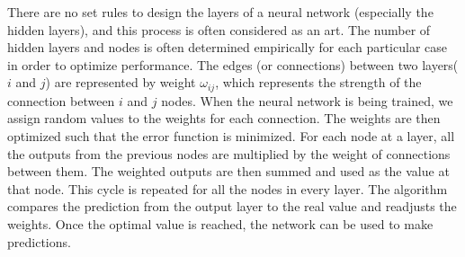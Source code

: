 There are no set rules to design the layers of a neural network (especially the hidden layers), and this process is often considered as an art\cite{NN}. The number of hidden layers and nodes is often determined empirically for each particular case in order to optimize performance. The edges (or connections) between two layers($i$ and $j$) are represented by weight $\omega_{ij}$, which represents the strength of the connection between $i$ and $j$ nodes. When the neural network is being trained, we assign random values to the weights for each connection. The weights are then optimized such that the error function is minimized. For each node at a layer, all the outputs from the previous nodes are multiplied by the weight of connections between them. The weighted outputs are then summed and used as the value at that node. This cycle is repeated for all the nodes in every layer. The algorithm compares the prediction from the output layer to the real value and readjusts the weights. Once the optimal value is reached, the network can be used to make predictions\cite{hall199}.

